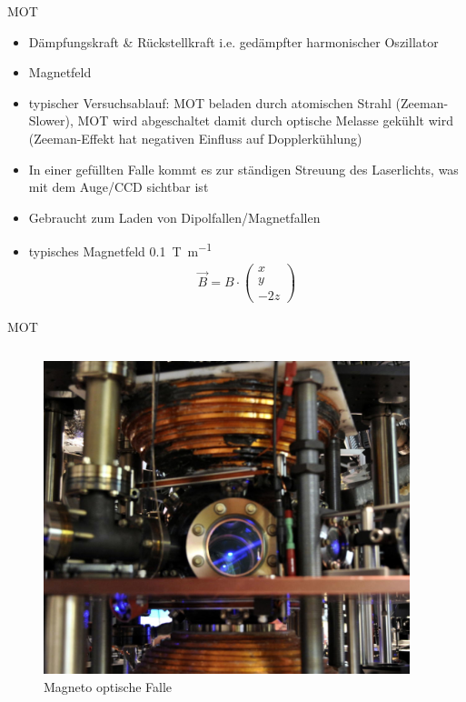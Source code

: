 \documentclass[12pt,xcolor=dvipsnames]{beamer}
\begin{document}
\begin{frame}{MOT}
	\begin{itemize}
		\item Dämpfungskraft \& Rückstellkraft i.e. gedämpfter harmonischer Oszillator
		\item Magnetfeld
		\item typischer Versuchsablauf: MOT beladen durch atomischen Strahl (Zeeman-Slower), MOT wird abgeschaltet damit durch optische Melasse gekühlt wird (Zeeman-Effekt hat negativen Einfluss auf Dopplerkühlung)
		\item In einer gefüllten Falle kommt es zur ständigen Streuung des Laserlichts, was mit dem Auge/CCD sichtbar ist
		\item Gebraucht zum Laden von Dipolfallen/Magnetfallen
		\item typisches Magnetfeld \SI{0.1}{\tesla\per\metre}
		\begin{align}
		\vec{B} = B \cdot \begin{pmatrix}
		x \\ y \\ -2z
		\end{pmatrix}
		\end{align}
	\end{itemize}
\end{frame}

\begin{frame}{MOT}
\begin{columns}

	\begin{figure}
		\centering
		\includegraphics[width=0.95\textwidth]{./figures/mot_columbia.jpg}
		\caption{Magneto optische Falle \cite{columbia}}
	\end{figure}
\end{columns}
\end{frame}
\end{document}
